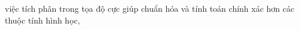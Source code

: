 \documentclass[preview]{standalone}
\begin{document}
\begin{center}
việc tích phân trong tọa độ cực giúp chuẩn hóa và tính toán chính xác hơn các thuộc tính hình học,
\end{center}
\end{document}
